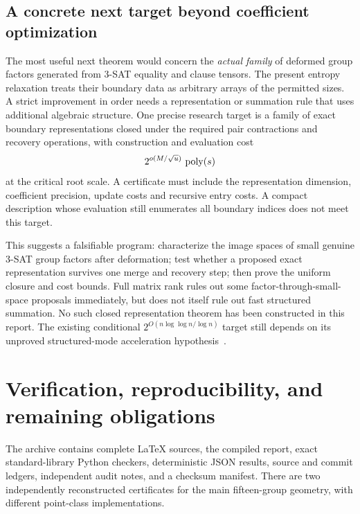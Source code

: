 \subsection{A concrete next target beyond coefficient optimization}

The most useful next theorem would concern the \emph{actual family} of
deformed group factors generated from 3-SAT equality and clause tensors.
The present entropy relaxation treats their boundary data as arbitrary
arrays of the permitted sizes. A strict improvement in order needs a
representation or summation rule that uses additional algebraic structure.
One precise research target is a family of exact boundary representations
closed under the required pair contractions and recovery operations, with
construction and evaluation cost
\[
 2^{o(M/\sqrt u)}\,\operatorname{poly}(s)
\]
at the critical root scale. A certificate must include the representation
dimension, coefficient precision, update costs and recursive entry costs.
A compact description whose evaluation still enumerates all boundary
indices does not meet this target.

This suggests a falsifiable program: characterize the image spaces of
small genuine 3-SAT group factors after deformation; test whether a
proposed exact representation survives one merge and recovery step;
then prove the uniform closure and cost bounds. Full matrix rank rules out
some factor-through-small-space proposals immediately, but does not itself
rule out fast structured summation. No such closed representation theorem
has been constructed in this report. The existing conditional
$2^{O(n\log\log n/\log n)}$ target still depends on its unproved
structured-mode acceleration hypothesis~\cite{precision}.

\section{Verification, reproducibility, and remaining obligations}
\label{sec:verification}

The archive contains complete LaTeX sources, the compiled report, exact
standard-library Python checkers, deterministic JSON results, source and
commit ledgers, independent audit notes, and a checksum manifest.
There are two independently reconstructed certificates for the main
fifteen-group geometry, with different point-class implementations.


